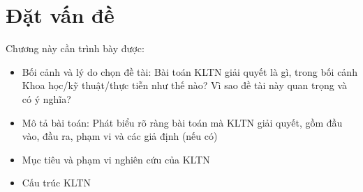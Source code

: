 \chapter{Đặt vấn đề}

Chương này cần trình bày được:
\begin{itemize}
    \item Bối cảnh và lý do chọn đề tài: Bài toán KLTN giải quyết là gì, trong bối cảnh Khoa học/kỹ thuật/thực tiễn như thế nào? Vì sao đề tài này quan trọng và có ý nghĩa?

    \item Mô tả bài toán: Phát biểu rõ ràng bài toán mà KLTN giải quyết, gồm đầu vào, đầu ra, phạm vi và các giả định (nếu có)

    \item Mục tiêu và phạm vi nghiên cứu của KLTN
    \item Cấu trúc KLTN
\end{itemize}
